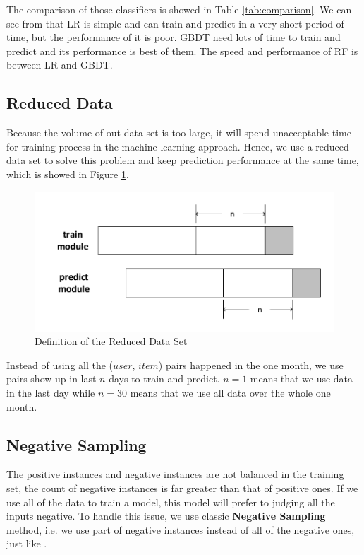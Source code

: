 \documentclass{llncs}
\begin{document}
The comparison of those classifiers is showed in Table \ref{tab:comparison}.
We can see from that LR is simple and can train and predict in a very short period of time,
but the performance of it is poor.
GBDT need lots of time to train and predict and its performance is best of them.
The speed and performance of RF is between LR and GBDT. 

\subsection{Reduced Data}
Because the volume of out data set is too large,
it will spend unacceptable time for training process
in the machine learning approach.
Hence, we use a reduced data set to solve this problem
and keep prediction performance at the same time,
which is showed in Figure \ref{fig:reduced_data_set}.

\begin{figure}[htbp]
	\centering
	\includegraphics[scale=0.5]{images/reduced_data_set.pdf}
	\caption{Definition of the Reduced Data Set}
	\label{fig:reduced_data_set}
\end{figure}

Instead of using all the ($user$, $item$) pairs happened in the one month,
we use pairs show up in last $n$ days to train and predict.
$n = 1$ means that we use data in the last day while
$n = 30$ means that we use all data over the whole one month.

\subsection{Negative Sampling}
The positive instances and negative instances are not balanced in the training set,
the count of negative instances is far greater than that of positive ones.
If we use all of the data to train a model,
this model will prefer to judging all the inputs negative.
To handle this issue, we use classic \textbf{Negative Sampling} method,
i.e. we use part of negative instances instead of all of the negative ones,
just like \cite{bowling2006machine}.
\end{document}
